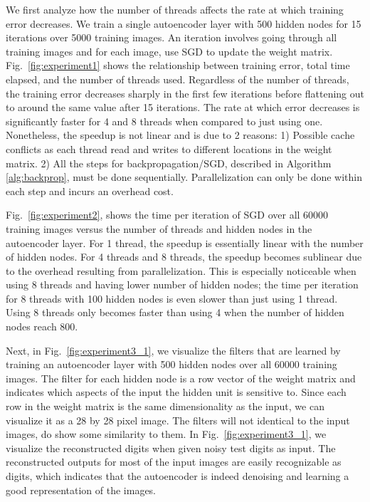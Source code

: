 \documentclass[conference]{IEEEtran}
\begin{document}
We first analyze how the number of threads affects the rate at which training error decreases. We train a single autoencoder layer with 500 hidden nodes for 15 iterations over 5000 training images. An iteration involves going through all training images and for each image, use SGD to update the weight matrix. Fig.~\ref{fig:experiment1} shows the relationship between training error, total time elapsed, and the number of threads used. Regardless of the number of threads, the training error decreases sharply in the first few iterations before flattening out to around the same value after 15 iterations. The rate at which error decreases is significantly faster for 4 and 8 threads when compared to just using one. Nonetheless, the speedup is not linear and is due to 2 reasons: 1) Possible cache conflicts as each thread read and writes to different locations in the weight matrix. 2) All the steps for backpropagation/SGD, described in Algorithm \ref{alg:backprop}, must be done sequentially. Parallelization can only be done within each step and incurs an overhead cost.

Fig.~\ref{fig:experiment2}, shows the time per iteration of SGD over all 60000 training images versus the number of threads and hidden nodes in the autoencoder layer. For 1 thread, the speedup is essentially linear with the number of hidden nodes. For 4 threads and 8 threads, the speedup becomes sublinear due to the overhead resulting from parallelization. This is especially noticeable when using 8 threads and having lower number of hidden nodes; the time per iteration for 8 threads with 100 hidden nodes is even slower than just using 1 thread. Using 8 threads only becomes faster than using 4 when the number of hidden nodes reach 800. 

Next, in Fig.~\ref{fig:experiment3_1}, we visualize the filters that are learned by training an autoencoder layer with 500 hidden nodes over all 60000 training images. The  filter for each hidden node is a row vector of the weight matrix and indicates which aspects of the input the hidden unit is sensitive to. Since each row in the weight matrix is the same dimensionality as the input, we can visualize it as a 28 by 28 pixel image. The filters will not identical to the input images, do show some similarity to them. In Fig.~\ref{fig:experiment3_1}, we visualize the reconstructed digits when given noisy test digits as input. The reconstructed outputs for most of the input images are easily recognizable as digits, which indicates that the autoencoder is indeed denoising and learning a good representation of the images.
\end{document}
